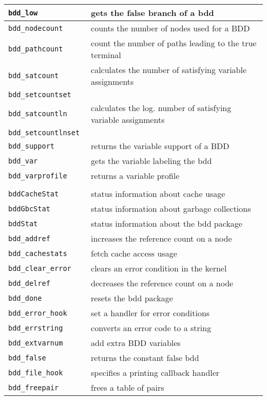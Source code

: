\begin{supertabular}{|l|l|}
{\tt bdd\_low } & gets the false branch of a bdd   \\\hline
{\tt bdd\_nodecount } & counts the number of nodes used for a BDD  \\\hline
{\tt bdd\_pathcount } & count the number of paths leading to the true terminal  \\\hline
{\tt bdd\_satcount } & calculates the number of satisfying variable assignments  \\
{\tt bdd\_setcountset } & \\\hline
{\tt bdd\_satcountln } & calculates the log. number of satisfying variable assignments  \\
{\tt bdd\_setcountlnset } & \\\hline
{\tt bdd\_support } & returns the variable support of a BDD  \\\hline
{\tt bdd\_var } & gets the variable labeling the bdd  \\\hline
{\tt bdd\_varprofile } & returns a variable profile  \\\hline
{} \\ \hline
{\tt bddCacheStat } & status information about cache usage  \\\hline
{\tt bddGbcStat } & status information about garbage collections  \\\hline
{\tt bddStat } & status information about the bdd package  \\\hline
{\tt bdd\_addref } & increases the reference count on a node  \\\hline
{\tt bdd\_cachestats } & fetch cache access usage  \\\hline
{\tt bdd\_clear\_error } & clears an error condition in the kernel  \\\hline
{\tt bdd\_delref } & decreases the reference count on a node  \\\hline
{\tt bdd\_done} & resets the bdd package  \\\hline
{\tt bdd\_error\_hook } & set a handler for error conditions  \\\hline
{\tt bdd\_errstring } & converts an error code to a string \\\hline
{\tt bdd\_extvarnum } & add extra BDD variables  \\\hline
{\tt bdd\_false } & returns the constant false bdd  \\\hline
{\tt bdd\_file\_hook } & specifies a printing callback handler  \\\hline
{\tt bdd\_freepair } & frees a table of pairs  \\\hline

\end{supertabular}

